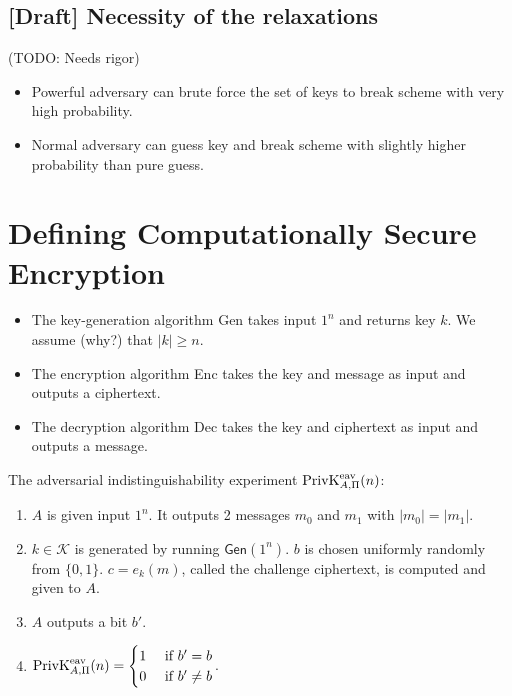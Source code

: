 \subsection{[Draft] Necessity of the relaxations}

(TODO: Needs rigor)

\begin{itemize}
\item Powerful adversary can brute force the set of keys to break scheme with very high probability.
\item Normal adversary can guess key and break scheme with slightly higher probability than pure guess.
\end{itemize}

\section{Defining Computationally Secure Encryption}

\begin{itemize}
\item The key-generation algorithm \textsf{Gen} takes input $1^n$ and returns key $k$.
We assume (why?) that $|k| \ge n$.
\item The encryption algorithm \textsf{Enc} takes the key and message as input and outputs a ciphertext.
\item The decryption algorithm \textsf{Dec} takes the key and ciphertext as input and outputs a message.
\end{itemize}

\begin{definition}
The adversarial indistinguishability experiment $\PrivKExpt{eav}{A,\Pi}(n)$:
\begin{enumerate}
\item $A$ is given input $1^n$. It outputs 2 messages $m_0$ and $m_1$ with $|m_0| = |m_1|$.
\item $k \in \mathcal{K}$ is generated by running $\mathsf{Gen}(1^n)$.
$b$ is chosen uniformly randomly from $\{0, 1\}$.
$c = e_k(m)$, called the challenge ciphertext, is computed and given to $A$.
\item $A$ outputs a bit $b'$.
\item $\PrivKExpt{eav}{A,\Pi}(n) = \begin{cases}1 & \textrm{ if } b' = b \\ 0 & \textrm{ if } b' \neq b\end{cases}$.
\end{enumerate}
\end{definition}

